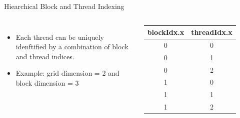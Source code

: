 \documentclass{beamer}
\begin{document}
    \begin{frame}{Hiearchical Block and Thread Indexing}
            \begin{columns}
                \begin{itemize}
                    \item Each thread can be uniquely idenftified by a combination of block and thread indices.
                    \item Example: grid dimension = 2 and block dimension = 3
                \end{itemize}
                \begin{table}[]
                    \begin{tabular}{|c||c|}
                        \hline
                        blockIdx.x & threadIdx.x \\
                        \hline
                        \hline
                        0          & 0           \\
                        0          & 1           \\
                        0          & 2           \\
                        \hline
                        1          & 0           \\
                        1          & 1           \\
                        1          & 2           \\
                        \hline
                    \end{tabular}
                \end{table}
            \end{columns}
        \end{frame}
\end{document}
